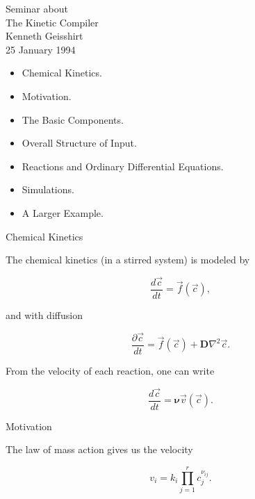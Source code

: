 
\parindent=0cm
\pagestyle{empty}

\Large
\vspace{5cm}
\begin{center}
Seminar about \\
The Kinetic Compiler \\

\vspace{2cm}
Kenneth Geisshirt \\
25 January 1994
\end{center}

\vspace{5cm}
\begin{itemize}
\item Chemical Kinetics.
\item Motivation.
\item The Basic Components.
\item Overall Structure of Input.
\item Reactions and Ordinary Differential Equations.
\item Simulations.
\item A Larger Example.
\end{itemize}
\newpage

\begin{center}
Chemical Kinetics
\end{center}

\vspace{2cm}
The chemical kinetics (in a stirred system) is modeled by

\[
  \frac{d\vec{c}}{dt} = \vec{f}(\vec{c}),
\]

\vspace{1cm}
and with diffusion

\[
  \frac{\partial\vec{c}}{dt} = \vec{f}(\vec{c}) + \mathbf{D}\nabla^2 \vec{c}.
\]

\vspace{1.5cm}
From the velocity of each reaction, one can write

\[
  \frac{d\vec{c}}{dt} = \mathbf{\nu}\vec{v}(\vec{c}).
\]

\newpage
\begin{center}
Motivation
\end{center}

\vspace{1cm}
The law of mass action gives us the velocity

\[
  v_i = k_i \prod_{j=1}^r c_j^{\nu_{ij}}.
\]

